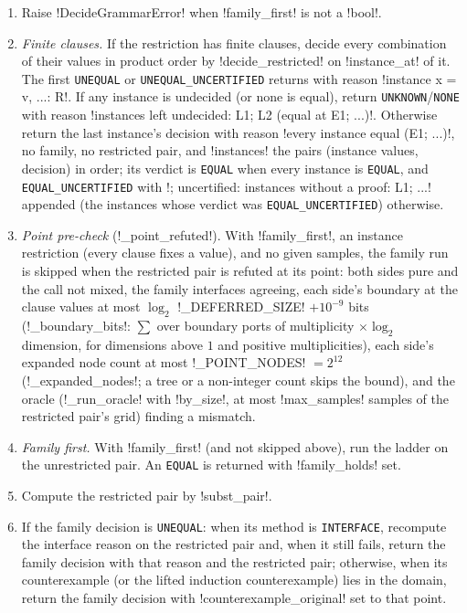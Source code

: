 \begin{algorithm}\label{alg:proofs-restricted}
\leavevmode
\begin{enumerate}
\item Raise \py!DecideGrammarError! when \py!family_first! is not a \py!bool!.
\item \emph{Finite clauses.} If the restriction has finite clauses, decide every combination of their values in product order by \py!decide_restricted! on \py!instance_at! of it. The first \texttt{UNEQUAL} or \texttt{UNEQUAL\_UNCERTIFIED} returns with reason \code!instance x = v, ...: R!. If any instance is undecided (or none is equal), return \texttt{UNKNOWN}/\texttt{NONE} with reason \code!instances left undecided: L1; L2 (equal at E1; ...)!. Otherwise return the last instance's decision with reason \code!every instance equal (E1; ...)!, no family, no restricted pair, and \py!instances! the pairs (instance values, decision) in order; its verdict is \texttt{EQUAL} when every instance is \texttt{EQUAL}, and \texttt{EQUAL\_UNCERTIFIED} with \code!; uncertified: instances without a proof: L1; ...! appended (the instances whose verdict was \texttt{EQUAL\_UNCERTIFIED}) otherwise.
\item \emph{Point pre-check} (\py!_point_refuted!). With \py!family_first!, an instance restriction (every clause fixes a value), and no given samples, the family run is skipped when the restricted pair is refuted at its point: both sides pure and the call not mixed, the family interfaces agreeing, each side's boundary at the clause values at most $\log_2$ \py!_DEFERRED_SIZE! $+10^{-9}$ bits (\py!_boundary_bits!: $\sum$ over boundary ports of multiplicity $\times\log_2$ dimension, for dimensions above $1$ and positive multiplicities), each side's expanded node count at most \py!_POINT_NODES! $=2^{12}$ (\py!_expanded_nodes!; a tree \bbox{} or a non-integer count skips the bound), and the oracle (\py!_run_oracle! with \py!by_size!, at most \py!max_samples! samples of the restricted pair's grid) finding a mismatch.
\item \emph{Family first.} With \py!family_first! (and not skipped above), run the ladder on the unrestricted pair. An \texttt{EQUAL} is returned with \py!family_holds! set.
\item Compute the restricted pair by \py!subst_pair!.
\item If the family decision is \texttt{UNEQUAL}: when its method is \texttt{INTERFACE}, recompute the interface reason on the restricted pair and, when it still fails, return the family decision with that reason and the restricted pair; otherwise, when its counterexample (or the lifted induction counterexample) lies in the domain, return the family decision with \py!counterexample_original! set to that point.

\end{enumerate}
\end{algorithm}
